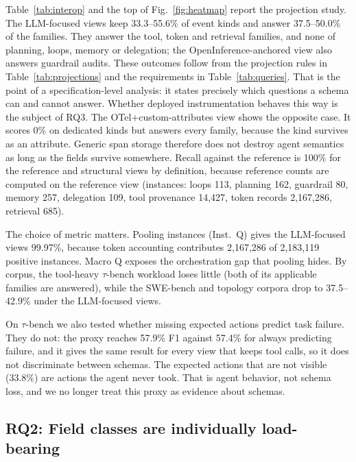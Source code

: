 \documentclass[conference]{IEEEtran}
\begin{document}
Table~\ref{tab:interop} and the top of Fig.~\ref{fig:heatmap} report the
projection study. The LLM-focused views keep 33.3--55.6\% of event kinds
and answer 37.5--50.0\% of the families. They answer the tool, token and
retrieval families, and none of planning, loops, memory or delegation;
the OpenInference-anchored view also answers guardrail audits. These
outcomes follow from the projection rules in Table~\ref{tab:projections}
and the requirements in Table~\ref{tab:queries}. That is the point of a
specification-level analysis: it states precisely which questions a
schema can and cannot answer. Whether deployed instrumentation behaves
this way is the subject of RQ3. The OTel+custom-attributes view shows
the opposite case. It scores 0\% on dedicated kinds but answers every
family, because the kind survives as an attribute. Generic span storage
therefore does not destroy agent semantics as long as the fields survive
somewhere. Recall against the reference is 100\% for the reference and
structural views by definition, because reference counts are computed on
the reference view (instances: loops 113, planning 162, guardrail 80,
memory 257, delegation 109, tool provenance 14,427, token records
2,167,286, retrieval 685).

The choice of metric matters. Pooling instances (Inst.\ Q) gives the
LLM-focused views 99.97\%, because token accounting contributes
2,167,286 of 2,183,119 positive instances. Macro Q exposes the
orchestration gap that pooling hides. By corpus, the tool-heavy
$\tau$-bench workload loses little (both of its applicable families are
answered), while the SWE-bench and topology corpora drop to
37.5--42.9\% under the LLM-focused views.

On $\tau$-bench we also tested whether missing expected actions predict
task failure. They do not: the proxy reaches 57.9\% F1 against 57.4\%
for always predicting failure, and it gives the same result for every
view that keeps tool calls, so it does not discriminate between schemas.
The expected actions that are not visible (33.8\%) are actions the agent
never took. That is agent behavior, not schema loss, and we no longer
treat this proxy as evidence about schemas.

\subsection{RQ2: Field classes are individually load-bearing}
\end{document}
